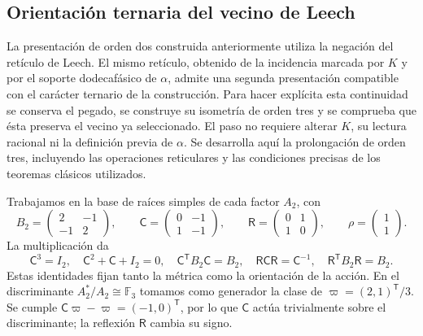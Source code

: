 
\subsection{Orientación ternaria del vecino de Leech}
\label{km:orden-tres-reticular}

La presentación de orden dos construida anteriormente utiliza la negación
del retículo de Leech. El mismo retículo, obtenido de la incidencia marcada
por \(K\) y por el soporte dodecafásico de \(\alpha\), admite una segunda
presentación compatible con el carácter ternario de la construcción.
Para hacer explícita esta continuidad se conserva el pegado, se construye
su isometría de orden tres y se comprueba que ésta preserva el vecino ya
seleccionado. El paso no requiere alterar \(K\), su lectura racional ni
la definición previa de \(\alpha\). Se desarrolla aquí la prolongación de orden tres, incluyendo las operaciones
reticulares y las condiciones precisas de los teoremas clásicos utilizados.

Trabajamos en la base de raíces simples de cada factor \(A_2\), con
\begin{equation}
 B_2=\begin{pmatrix}2&-1\\-1&2\end{pmatrix},\qquad
 \mathsf C=\begin{pmatrix}0&-1\\1&-1\end{pmatrix},\qquad
 \mathsf R=\begin{pmatrix}0&1\\1&0\end{pmatrix},\qquad
 \rho=\begin{pmatrix}1\\1\end{pmatrix}.
 \label{km:coxeter-reflexion}
\end{equation}
La multiplicación da
\[
 \mathsf C^3=I_2,\quad
 \mathsf C^2+\mathsf C+I_2=0,\quad
 \mathsf C^{\mathsf T}B_2\mathsf C=B_2,\quad
 \mathsf R\mathsf C\mathsf R=\mathsf C^{-1},\quad
 \mathsf R^{\mathsf T}B_2\mathsf R=B_2.
\]
Estas identidades fijan tanto la métrica como la orientación de la acción.
En el discriminante \(A_2^*/A_2\cong\mathbb F_3\) tomamos como
generador la clase de \(\varpi=(2,1)^{\mathsf T}/3\). Se cumple
\(\mathsf C\varpi-\varpi=(-1,0)^{\mathsf T}\), por lo que
\(\mathsf C\) actúa trivialmente sobre el discriminante; la reflexión
\(\mathsf R\) cambia su signo.


